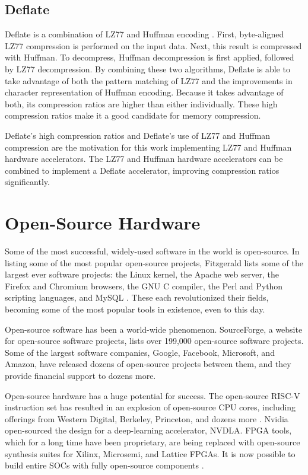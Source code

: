 \documentclass[doublespace,nopageskip]{VTthesis}
\begin{document}
\subsection{Deflate}\label{ss:deflate}
Deflate is a combination of LZ77 and Huffman encoding \cite{deflate}. First, byte-aligned LZ77 compression is performed on the input data. Next, this result is compressed with Huffman. To decompress, Huffman decompression is first applied, followed by LZ77 decompression. By combining these two algorithms, Deflate is able to take advantage of both the pattern matching of LZ77 and the improvements in character representation of Huffman encoding. Because it takes advantage of both, its compression ratios are higher than either individually. These high compression ratios make it a good candidate for memory compression.

Deflate's high compression ratios and Deflate's use of LZ77 and Huffman compression are the motivation for this work implementing LZ77 and Huffman hardware accelerators. The LZ77 and Huffman hardware accelerators can be combined to implement a Deflate accelerator, improving compression ratios significantly.

\section{Open-Source Hardware}\label{se:open-source_motivation}
Some of the most successful, widely-used software in the world is open-source. In listing some of the most popular open-source projects, Fitzgerald lists some of the largest ever software projects: the Linux kernel, the Apache web server, the Firefox and Chromium browsers, the GNU C compiler, the Perl and Python scripting languages, and MySQL \cite{oss2.0}. These each revolutionized their fields, becoming some of the most popular tools in existence, even to this day.

Open-source software has been a world-wide phenomenon. SourceForge, a website for open-source software projects, lists over 199,000 open-source software projects. Some of the largest software companies, Google, Facebook, Microsoft, and Amazon, have released dozens of open-source projects between them, and they provide financial support to dozens more.

Open-source hardware has a huge potential for success. The open-source RISC-V instruction set has resulted in an explosion of open-source CPU cores, including offerings from Western Digital, Berkeley, Princeton, and dozens more \cite{boom, blackparrot, openpiton}. Nvidia open-sourced the design for a deep-learning accelerator, NVDLA. FPGA tools, which for a long time have been proprietary, are being replaced with open-source synthesis suites for Xilinx, Microsemi, and Lattice FPGAs. It is now possible to build entire SOCs with fully open-source components \cite{litex}.
\end{document}
